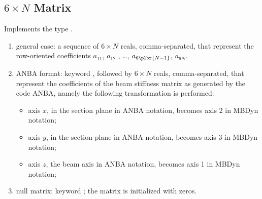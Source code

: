 \subsection{$6 \times N$ Matrix}
\label{sec:Mat6xN}
Implements the type .
\begin{enumerate}
    \item general case: a sequence of $6 \times N$ reals, comma-separated, that
    represent the row-oriented coefficients $ a_{11} $, $ a_{12}$ ,
    \ldots, $ a_{6\plbr{N-1}} $, $ a_{6N} $.
    \item ANBA format: keyword , followed by $6 \times N$ reals,
    comma-separated, that represent the coefficients of the beam stiffness
    matrix as generated by the code ANBA, namely the following
    transformation is performed:
    \begin{itemize}
        \item axis $ x $, in the section plane in ANBA notation, 
	becomes axis 2 in MBDyn notation;    
	\item axis $ y $, in the section plane in ANBA notation, 
	becomes axis 3 in MBDyn notation;    
	\item axis $ z $, the beam axis in ANBA notation, 
	becomes axis 1 in MBDyn notation;    
    \end{itemize}
    \item null matrix: keyword ; the matrix is initialized 
    with zeros.
\end{enumerate}

